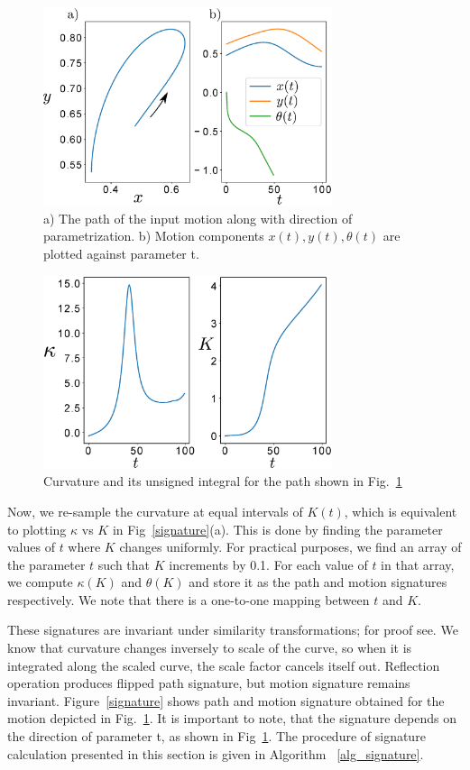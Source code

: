 \documentclass[twocolumn,10pt]{asme2ej}
\begin{document}
\begin{figure}
\centering
\includegraphics[width=240pt]{figure/fig_bspline.eps}
  \caption{a) The path of the input motion along with direction of parametrization. b) Motion components $x(t), y(t), \theta(t)$ are plotted against parameter t.}
\label{bsplineFitting}
\end{figure}

\begin{figure}
\centering
\includegraphics[width=240pt]{figure/fig_curvatureK.eps}
  \caption{Curvature and its unsigned integral for the path shown in Fig.~\ref{bsplineFitting}}
\label{curvatureK}
\end{figure}

Now, we re-sample the curvature at equal intervals of $K(t)$, which is equivalent to plotting $\kappa$ vs $K$ in Fig~\ref{signature}(a).
This is done by finding the parameter values of $t$ where $K$ changes uniformly.
For practical purposes, we find an array of the parameter $t$ such that $K$ increments by 0.1.
For each value of $t$ in that array, we compute $\kappa(K)$ and $\theta(K)$ and store it as the path and motion signatures respectively.
We note that there is a one-to-one mapping between $t$ and $K$.

These signatures are invariant under similarity transformations; for proof see\cite{cui2009}.
We know that curvature changes inversely to scale of the curve, so when it is integrated along the scaled curve, the scale factor cancels itself out. Reflection operation produces flipped path signature, but motion signature remains invariant.
Figure~\ref{signature} shows path and motion signature obtained for the motion depicted in Fig.~\ref{bsplineFitting}. It is important to note, that the signature depends on the direction of parameter t, as shown in Fig~\ref{bsplineFitting}.
The procedure of signature calculation presented in this section is given in Algorithm ~\ref{alg_signature}.
\end{document}
